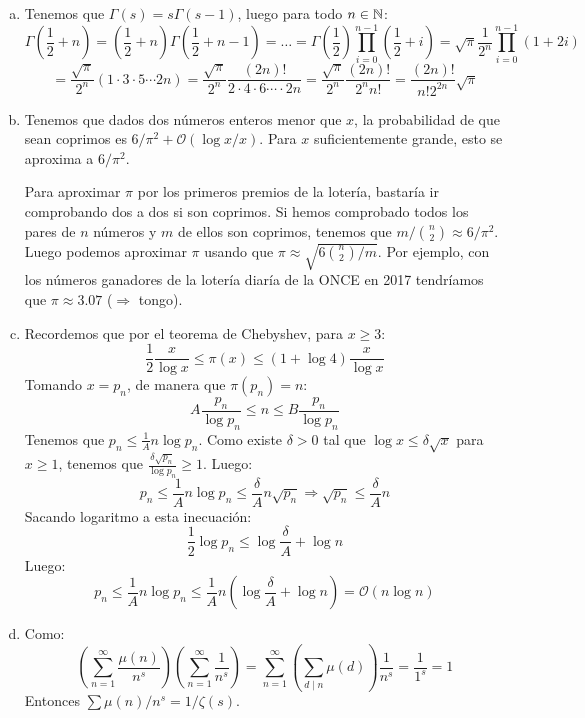 \documentclass[twoside]{article}
\providecommand{\bo}[1]{\mathcal{O}\left(#1\right)}
\begin{document}
\begin{solucion}
\begin{enumerate}[(a)]
\item Tenemos que $Γ(s)=sΓ(s-1)$, luego para todo $n \in \mathbb{N}$:
	\[ Γ\left(\frac{1}{2}+n\right) = \left(\frac{1}{2}+n\right) Γ\left(\frac{1}{2}+n-1\right) = \dots = Γ\left(\frac{1}{2}\right)\prod_{i=0}^{n-1}\left(\frac{1}{2}+i\right) = \sqrt{π}\frac{1}{2^n}\prod_{i=0}^{n-1}\left(1+2i\right)\]
	\[ = \frac{\sqrt{π}}{2^n}(1 \cdot 3 \cdot 5 \cdots 2n) = \frac{\sqrt{π}}{2^n}\frac{(2n)!}{2 \cdot 4 \cdot 6 \cdots \cdot 2n} = \frac{\sqrt{π}}{2^n}\frac{(2n)!}{2^n n!}  = \frac{(2n)!}{n!2^{2n}}\sqrt{π} \]
	
\item Tenemos que dados dos números enteros menor que $x$, la probabilidad de que sean coprimos es $6/π^2+\bo{\log x/x}$.
	Para $x$ suficientemente grande, esto se aproxima a $6/π^2$.
	
Para aproximar $π$ por los primeros premios de la lotería, bastaría ir comprobando dos a dos si son coprimos.
Si hemos comprobado todos los pares de $n$ números y $m$ de ellos son coprimos, tenemos que $m/\binom{n}{2} \approx 6/π^2$.
Luego podemos aproximar $π$ usando que $π \approx \sqrt{6\binom{n}{2}/m}$.
Por ejemplo, con los números ganadores de la lotería diaría de la ONCE en 2017 tendríamos que $π \approx 3.07$ ($\Rightarrow$ tongo).

\item Recordemos que por el teorema de Chebyshev, para $x ≥ 3$:
\[ \frac{1}{2} \frac{x}{\log x} ≤ π(x) ≤ (1 + \log 4)\frac{x}{\log x} \]
Tomando $x = p_n$, de manera que $π(p_n)=n$:
\[ A \frac{p_n}{\log p_n} ≤ n ≤ B \frac{p_n}{\log p_n}\]
Tenemos que $p_n ≤ \frac{1}{A} n \log p_n$. Como existe $δ > 0$ tal que $\log x ≤ δ \sqrt{x}$ para $x≥1$, tenemos que $\frac{δ\sqrt{p_n}}{\log p_n} ≥ 1$. Luego:
\[ p_n ≤ \frac{1}{A} n \log p_n ≤ \frac{δ}{A}n\sqrt{p_n} \Rightarrow \sqrt{p_n} ≤ \frac{δ}{A}n \]
Sacando logaritmo a esta inecuación:
\[ \frac{1}{2} \log p_n ≤ \log \frac{δ}{A} + \log n\]
Luego:
\[ p_n ≤ \frac{1}{A} n \log p_n ≤ \frac{1}{A}n(\log \frac{δ}{A} + \log n) = \mathcal{O}(n\log n) \]

\item Como:
\[ \left(\sum_{n=1}^{∞} \frac{μ(n)}{n^s}\right) \left(\sum_{n=1}^{∞} \frac{1}{n^s}\right) = \sum_{n=1}^{∞} \left(\sum_{d\mid n} μ(d) \right)\frac{1}{n^s} = \frac{1}{1^s} = 1 \]
Entonces $\sum μ(n)/n^s = 1/ζ(s)$.
\end{enumerate}
\end{solucion}
\end{document}
